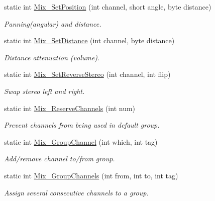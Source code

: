 \begin{DoxyCompactItemize}
static int \hyperlink{namespace_tao_1_1_sdl_ad33cd3ef7af676c3717a45839d65ab82}{Mix\_\-SetPosition} (int channel, short angle, byte distance)
\begin{DoxyCompactList}\small\item\em Panning(angular) and distance. \item\end{DoxyCompactList}\item 
static int \hyperlink{namespace_tao_1_1_sdl_af7b38a64044260e39136c6a3ef8b9732}{Mix\_\-SetDistance} (int channel, byte distance)
\begin{DoxyCompactList}\small\item\em Distance attenuation (volume). \item\end{DoxyCompactList}\item 
static int \hyperlink{namespace_tao_1_1_sdl_a7b7b48bbbe4007bd060cc01bb26c28d1}{Mix\_\-SetReverseStereo} (int channel, int flip)
\begin{DoxyCompactList}\small\item\em Swap stereo left and right. \item\end{DoxyCompactList}\item 
static int \hyperlink{namespace_tao_1_1_sdl_af107df0b0036f5cfebf1cb2a361cd949}{Mix\_\-ReserveChannels} (int num)
\begin{DoxyCompactList}\small\item\em Prevent channels from being used in default group. \item\end{DoxyCompactList}\item 
static int \hyperlink{namespace_tao_1_1_sdl_a31ad438a2a71cffaa8fccefa74158dac}{Mix\_\-GroupChannel} (int which, int tag)
\begin{DoxyCompactList}\small\item\em Add/remove channel to/from group. \item\end{DoxyCompactList}\item 
static int \hyperlink{namespace_tao_1_1_sdl_a7ec52e3afc27080a9396a7ed012a40f4}{Mix\_\-GroupChannels} (int from, int to, int tag)
\begin{DoxyCompactList}\small\item\em Assign several consecutive channels to a group. \item\end{DoxyCompactList}\item 

\end{DoxyCompactItemize}
